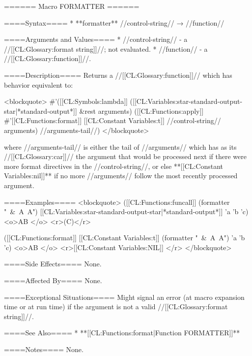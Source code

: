 ====== Macro FORMATTER ======

====Syntax====
  * **formatter** //control-string// → //function//

====Arguments and Values====
  * //control-string// - a //[[CL:Glossary:format string]]//; not evaluated.
  * //function// - a //[[CL:Glossary:function]]//.

====Description====
Returns a //[[CL:Glossary:function]]// which has behavior equivalent to:

<blockquote>
#'([[CL:Symbols:lambda]] ([[CL:Variables:star-standard-output-star|*standard-output*]] &rest arguments) 
    ([[CL:Functions:apply]] #'[[CL:Functions:format]] [[CL:Constant Variables:t]] //control-string// arguments) 
    //arguments-tail//)
    </blockquote>

where //arguments-tail// is either the tail of //arguments// which has as its //[[CL:Glossary:car]]// the argument that would be processed next if there were more format directives in the //control-string//, or else **[[CL:Constant Variables:nil]]** if no more //arguments// follow the most recently processed argument.

====Examples====
<blockquote>
([[CL:Functions:funcall]] (formatter "~&~A~A") [[CL:Variables:star-standard-output-star|*standard-output*]] 'a 'b 'c)
<o>AB </o>
<r>(C)</r>

([[CL:Functions:format]] [[CL:Constant Variables:t]] (formatter "~&~A~A") 'a 'b 'c)
<o>AB </o>
<r>[[CL:Constant Variables:NIL]] </r>
</blockquote>

====Side Effects====
None.

====Affected By====
None.

====Exceptional Situations====
Might signal an error (at macro expansion time or at run time) if the argument is not a valid //[[CL:Glossary:format string]]//.

====See Also====
  * **[[CL:Functions:format|Function FORMATTER]]**

====Notes====
None.

